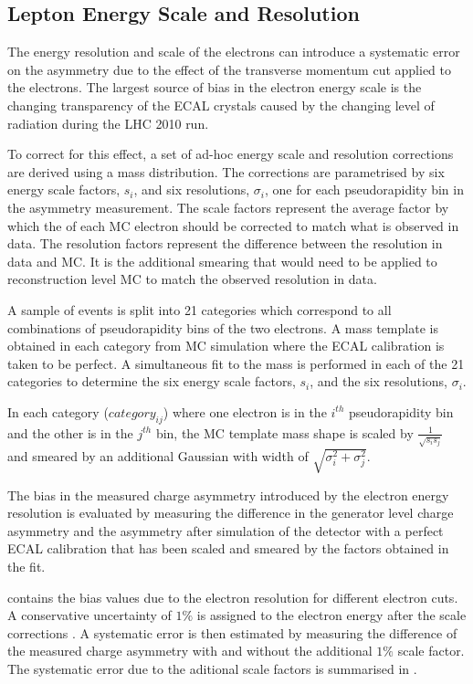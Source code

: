 \subsection{Lepton Energy Scale and Resolution}
\label{sec:adhoc}

The energy resolution and scale of the electrons can introduce a systematic
error on the asymmetry due to the effect of the transverse momentum cut applied
to the electrons. The largest source of bias in the electron energy scale is the
changing transparency of the ECAL crystals caused by the changing level of radiation
during the {LHC} 2010 run.

To correct for this effect, a set of ad-hoc energy scale and resolution corrections are
derived using a \Zee mass distribution. The corrections are parametrised by
six energy scale factors, $s_i$, and six resolutions, $\sigma_i$, one for each
pseudorapidity bin in the asymmetry measurement.
The scale factors represent the average factor by which the \pT of each {MC} electron
should be corrected to match what is observed in data.
The resolution factors represent the difference between the resolution in data and
{MC}. It is the additional smearing that would need to be applied to
reconstruction level {MC} to match the observed resolution in data.

A sample of \Zee events is  split into 21 categories which correspond to all
combinations of pseudorapidity bins of the two electrons.  A mass template is
obtained in each category from {MC} simulation where the {ECAL} calibration is
taken to be perfect.
A simultaneous fit to the \Zee mass is performed in each of the 21 categories
to determine the six energy scale factors, $s_i$, and the six resolutions, 
$\sigma_i$.

In each category ($category_{ij}$) where one electron is in the $i^{th}$
pseudorapidity bin and the other is in the $j^{th}$ bin, the {MC} template
mass shape is scaled by $\frac{1}{\sqrt{s_i s_j} } $
and smeared by an additional Gaussian with width of
$\sqrt{\sigma_i^2+\sigma_j^2}$.

The bias in the measured charge asymmetry introduced by the
electron energy resolution is evaluated by measuring the difference in the
generator level charge asymmetry and the asymmetry after simulation of the
detector with a perfect ECAL calibration that has been scaled and smeared by the
factors obtained in the fit.

 contains the bias values due to the electron resolution for
different electron \PT cuts. 
A conservative uncertainty of $1\%$ is assigned to the electron energy after the
scale corrections \cite{baisini2010electron}.  A systematic error is then
estimated by measuring the difference of the measured charge asymmetry with and
without the additional $1\%$ scale factor.
The systematic error due to the aditional scale factors is summarised in
.

